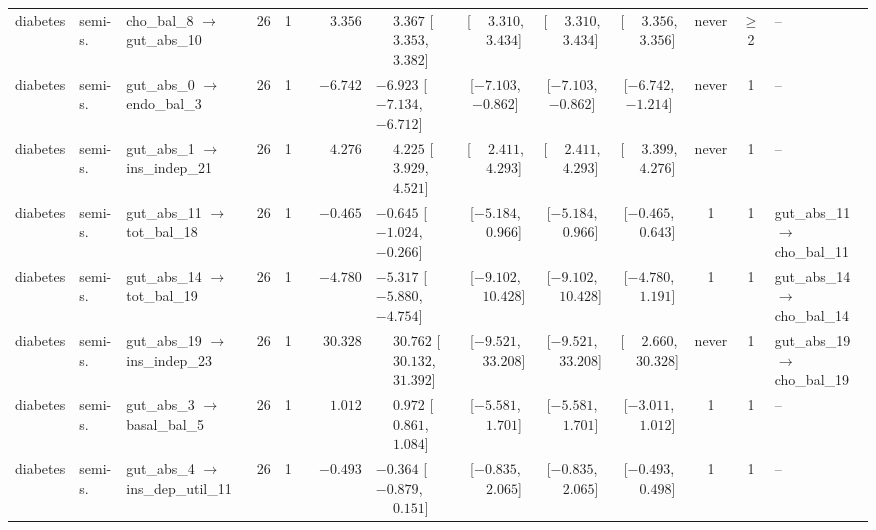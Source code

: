 \begin{landscape}
\begin{longtable}{@{}llp{2.15cm}ccrl cccc c l@{}}
diabetes & semi-s. & cho\_\allowbreak{}bal\_\allowbreak{}8 $\to$ gut\_\allowbreak{}abs\_\allowbreak{}10 & 26 & 1 & $\phantom{-}3.356$ & $\phantom{-}3.367$ [$\phantom{-}3.353$, $\phantom{-}3.382$] & [$\phantom{-}3.310$, $\phantom{-}3.434$] & [$\phantom{-}3.310$, $\phantom{-}3.434$] & [$\phantom{-}3.356$, $\phantom{-}3.356$] & never & $\geq$2 & -- \\
diabetes & semi-s. & gut\_\allowbreak{}abs\_\allowbreak{}0 $\to$ endo\_\allowbreak{}bal\_\allowbreak{}3 & 26 & 1 & $-6.742$ & $-6.923$ [$-7.134$, $-6.712$] & [$-7.103$, $-0.862$] & [$-7.103$, $-0.862$] & [$-6.742$, $-1.214$] & never & 1 & -- \\
diabetes & semi-s. & gut\_\allowbreak{}abs\_\allowbreak{}1 $\to$ ins\_\allowbreak{}indep\_\allowbreak{}21 & 26 & 1 & $\phantom{-}4.276$ & $\phantom{-}4.225$ [$\phantom{-}3.929$, $\phantom{-}4.521$] & [$\phantom{-}2.411$, $\phantom{-}4.293$] & [$\phantom{-}2.411$, $\phantom{-}4.293$] & [$\phantom{-}3.399$, $\phantom{-}4.276$] & never & 1 & -- \\
diabetes & semi-s. & gut\_\allowbreak{}abs\_\allowbreak{}11 $\to$ tot\_\allowbreak{}bal\_\allowbreak{}18 & 26 & 1 & $-0.465$ & $-0.645$ [$-1.024$, $-0.266$] & [$-5.184$, $\phantom{-}0.966$] & [$-5.184$, $\phantom{-}0.966$] & [$-0.465$, $\phantom{-}0.643$] & 1 & 1 & gut\_abs\_11$\to$cho\_bal\_11 \\
diabetes & semi-s. & gut\_\allowbreak{}abs\_\allowbreak{}14 $\to$ tot\_\allowbreak{}bal\_\allowbreak{}19 & 26 & 1 & $-4.780$ & $-5.317$ [$-5.880$, $-4.754$] & [$-9.102$, $\phantom{-}10.428$] & [$-9.102$, $\phantom{-}10.428$] & [$-4.780$, $\phantom{-}1.191$] & 1 & 1 & gut\_abs\_14$\to$cho\_bal\_14 \\
diabetes & semi-s. & gut\_\allowbreak{}abs\_\allowbreak{}19 $\to$ ins\_\allowbreak{}indep\_\allowbreak{}23 & 26 & 1 & $\phantom{-}30.328$ & $\phantom{-}30.762$ [$\phantom{-}30.132$, $\phantom{-}31.392$] & [$-9.521$, $\phantom{-}33.208$] & [$-9.521$, $\phantom{-}33.208$] & [$\phantom{-}2.660$, $\phantom{-}30.328$] & never & 1 & gut\_abs\_19$\to$cho\_bal\_19 \\
diabetes & semi-s. & gut\_\allowbreak{}abs\_\allowbreak{}3 $\to$ basal\_\allowbreak{}bal\_\allowbreak{}5 & 26 & 1 & $\phantom{-}1.012$ & $\phantom{-}0.972$ [$\phantom{-}0.861$, $\phantom{-}1.084$] & [$-5.581$, $\phantom{-}1.701$] & [$-5.581$, $\phantom{-}1.701$] & [$-3.011$, $\phantom{-}1.012$] & 1 & 1 & -- \\
diabetes & semi-s. & gut\_\allowbreak{}abs\_\allowbreak{}4 $\to$ ins\_\allowbreak{}dep\_\allowbreak{}util\_\allowbreak{}11 & 26 & 1 & $-0.493$ & $-0.364$ [$-0.879$, $\phantom{-}0.151$] & [$-0.835$, $\phantom{-}2.065$] & [$-0.835$, $\phantom{-}2.065$] & [$-0.493$, $\phantom{-}0.498$] & 1 & 1 & -- \\

\end{longtable}
\end{landscape}
